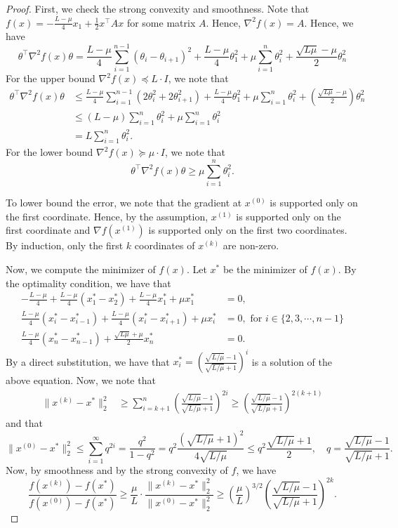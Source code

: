 \begin{proof}
First, we check the strong convexity and smoothness. Note that $f(x)=-\frac{L-\mu}{4}x_{1}+\frac{1}{2}x^{\top}Ax$
for some matrix $A$. Hence, $\nabla^{2}f(x)=A$. Hence, we have
\[
\theta^{\top}\nabla^{2}f(x)\theta=\frac{L-\mu}{4}\sum^{n-1}_{i=1}(\theta_{i}-\theta_{i+1})^{2}+\frac{L-\mu}{4}\theta^{2}_{1}+\mu\sum^{n}_{i=1}\theta^{2}_{i}+\frac{\sqrt{L\mu}-\mu}{2}\theta^{2}_{n}
\]
For the upper bound $\nabla^{2}f(x)\preceq L\cdot I$, we note that
\begin{align*}
\theta^{\top}\nabla^{2}f(x)\theta & \leq\frac{L-\mu}{4}\sum^{n-1}_{i=1}(2\theta^{2}_{i}+2\theta^{2}_{i+1})+\frac{L-\mu}{4}\theta^{2}_{1}+\mu\sum^{n}_{i=1}\theta^{2}_{i}+(\frac{\sqrt{L\mu}-\mu}{2})\theta^{2}_{n}\\
 & \leq(L-\mu)\sum^{n}_{i=1}\theta^{2}_{i}+\mu\sum^{n}_{i=1}\theta^{2}_{i}\\
 & =L\sum^{n}_{i=1}\theta^{2}_{i}.
\end{align*}
For the lower bound $\nabla^{2}f(x)\succeq\mu\cdot I$, we note that
\[
\theta^{\top}\nabla^{2}f(x)\theta\geq\mu\sum^{n}_{i=1}\theta^{2}_{i}.
\]

To lower bound the error, we note that the gradient at $x^{(0)}$
is supported only on the first coordinate. Hence, by the assumption,
$x^{(1)}$ is supported only on the first coordinate and $\nabla f(x^{(1)})$
is supported only on the first two coordinates. By induction, only
the first $k$ coordinates of $x^{(k)}$ are non-zero.

Now, we compute the minimizer of $f(x)$. Let $x^{*}$ be the minimizer
of $f(x)$. By the optimality condition, we have that
\begin{align*}
-\frac{L-\mu}{4}+\frac{L-\mu}{4}(x^{*}_{1}-x^{*}_{2})+\frac{L-\mu}{4}x^{*}_{1}+\mu x^{*}_{1} & =0,\\
\frac{L-\mu}{4}(x^{*}_{i}-x^{*}_{i-1})+\frac{L-\mu}{4}(x^{*}_{i}-x^{*}_{i+1})+\mu x^{*}_{i} & =0,\text{ for }i\in\{2,3,\cdots,n-1\}\\
\frac{L-\mu}{4}(x^{*}_{n}-x^{*}_{n-1})+\frac{\sqrt{L\mu}+\mu}{2}x^{*}_{n} & =0.
\end{align*}
By a direct substitution, we have that $x^{*}_{i}=(\frac{\sqrt{L/\mu}-1}{\sqrt{L/\mu}+1})^{i}$
is a solution of the above equation. Now, we note that
\begin{align*}
\|x^{(k)}-x^{*}\|^{2}_{2} & \geq\sum^{n}_{i=k+1}(\frac{\sqrt{L/\mu}-1}{\sqrt{L/\mu}+1})^{2i}\geq(\frac{\sqrt{L/\mu}-1}{\sqrt{L/\mu}+1})^{2(k+1)}
\end{align*}
and that
\[
\|x^{(0)}-x^{*}\|^{2}_{2}\leq\sum^{\infty}_{i=1}q^{2i}=\frac{q^{2}}{1-q^{2}}=q^{2}\frac{(\sqrt{L/\mu}+1)^{2}}{4\sqrt{L/\mu}}\leq q^{2}\frac{\sqrt{L/\mu}+1}{2},\quad q=\frac{\sqrt{L/\mu}-1}{\sqrt{L/\mu}+1}.
\]
Now, by smoothness and by the strong convexity of $f$, we have
\[
\frac{f(x^{(k)})-f(x^{*})}{f(x^{(0)})-f(x^{*})}\geq\frac{\mu}{L}\cdot\frac{\|x^{(k)}-x^{*}\|^{2}_{2}}{\|x^{(0)}-x^{*}\|^{2}_{2}}\geq(\frac{\mu}{L})^{3/2}(\frac{\sqrt{L/\mu}-1}{\sqrt{L/\mu}+1})^{2k}.
\]
\end{proof}
